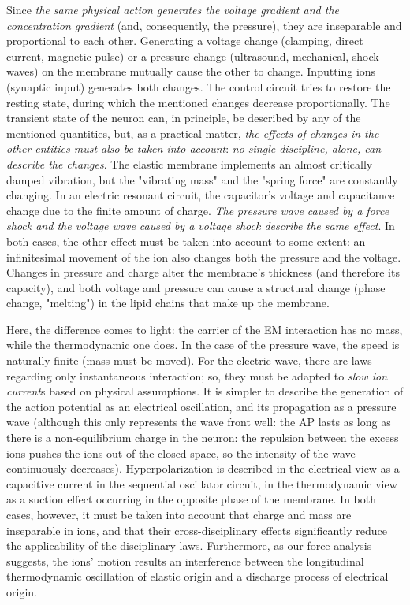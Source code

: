 Since \textit{the same physical action generates the voltage gradient and the concentration gradient} (and, consequently, the pressure), they are inseparable and proportional to each other.
Generating a voltage change (clamping, direct current, magnetic pulse) or a pressure change (ultrasound, mechanical, shock waves) on the membrane mutually cause the other to change. Inputting ions (synaptic input) generates both changes.
The control circuit tries to restore the resting state, during which the mentioned changes decrease proportionally.
The transient state of the neuron can, in principle, be described by any of the mentioned quantities, but, as a practical matter, \textit{the effects of changes in the other entities must also be taken into account}: \textit{no single discipline, alone, can describe the changes}.
The elastic membrane implements an almost critically damped vibration, but the "vibrating mass" and the "spring force" are constantly changing.
In an electric resonant circuit, the capacitor's voltage and capacitance change due to the finite amount of charge.
\textit{The pressure wave caused by a force shock and the voltage wave caused by a voltage shock describe the same effect}.
In both cases, the other effect must be taken into account to some extent: an infinitesimal movement of the ion also changes both the pressure and the voltage.
Changes in pressure and charge alter the membrane's thickness (and therefore its capacity), and both voltage and pressure can cause a structural change (phase change, "melting") in the lipid chains that make up the membrane.

Here, the difference comes to light: the carrier of the \gls{EM} interaction has no mass, while the thermodynamic one does.
In the case of the pressure wave, the speed is naturally finite (mass must be moved). For the electric wave, there are laws regarding only instantaneous interaction; so, they must be adapted to \textit{slow ion current}s based on physical assumptions.
It is simpler to describe the generation of the action potential as an electrical oscillation, and its propagation as a pressure wave (although this only represents the wave front well:
the \gls{AP} lasts as long as there is a non-equilibrium charge in the neuron: the repulsion between the excess ions pushes the ions out of the closed space, so the intensity of the wave continuously decreases).
Hyperpolarization is described in the electrical view as a capacitive current in the sequential oscillator circuit, in the thermodynamic view as a suction effect occurring in the opposite phase of the membrane. 
In both cases, however, it must be taken into account that charge and mass are inseparable in ions, and that their cross-disciplinary effects significantly reduce the applicability of the disciplinary laws.
Furthermore, as our force analysis suggests, the ions' motion results 
an interference between the longitudinal thermodynamic oscillation of elastic origin
and a discharge process of electrical origin. 
 
